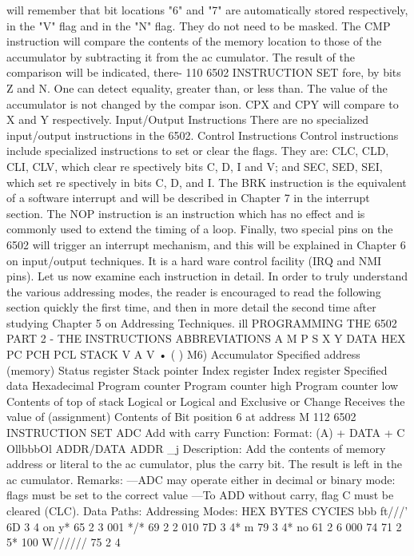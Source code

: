 will remember that bit locations "6" and "7" are automatically
stored respectively, in the "V" flag and in the "N" flag. They do not
need to be masked.
The CMP instruction will compare the contents of the memory
location to those of the accumulator by subtracting it from the ac
cumulator. The result of the comparison will be indicated, there-
110
6502 INSTRUCTION SET
fore, by bits Z and N. One can detect equality, greater than, or less
than. The value of the accumulator is not changed by the compar
ison. CPX and CPY will compare to X and Y respectively.
Input/Output Instructions
There are no specialized input/output instructions in the 6502.
Control Instructions
Control instructions include specialized instructions to set or
clear the flags. They are: CLC, CLD, CLI, CLV, which clear re
spectively bits C, D, I and V; and SEC, SED, SEI, which set re
spectively in bits C, D, and I.
The BRK instruction is the equivalent of a software interrupt
and will be described in Chapter 7 in the interrupt section.
The NOP instruction is an instruction which has no effect and is
commonly used to extend the timing of a loop. Finally, two special
pins on the 6502 will trigger an interrupt mechanism, and this will
be explained in Chapter 6 on input/output techniques. It is a hard
ware control facility (IRQ and NMI pins).
Let us now examine each instruction in detail.
In order to truly understand the various addressing modes, the reader
is encouraged to read the following section quickly the first time, and
then in more detail the second time after studying Chapter 5 on
Addressing Techniques.
ill
PROGRAMMING THE 6502
PART 2 - THE INSTRUCTIONS
ABBREVIATIONS
A
M
P
S
X
Y
DATA
HEX
PC
PCH
PCL
STACK
V
A
V
•
( )
M6)
Accumulator
Specified address (memory)
Status register
Stack pointer
Index register
Index register
Specified data
Hexadecimal
Program counter
Program counter high
Program counter low
Contents of top of stack
Logical or
Logical and
Exclusive or
Change
Receives the value of (assignment)
Contents of
Bit position 6 at address M
112
6502 INSTRUCTION SET
ADC Add with carry
Function:
Format:
(A) + DATA + C
OllbbbOl ADDR/DATA ADDR
_j
Description:
Add the contents of memory address or literal to the ac
cumulator, plus the carry bit. The result is left in the ac
cumulator.
Remarks:
—ADC may operate either in decimal or binary mode: flags
must be set to the correct value
—To ADD without carry, flag C must be cleared (CLC).
Data Paths:
Addressing Modes:
HEX
BYTES
CYCIES
bbb
ft///'
6D
3
4
on
y*
65
2
3
001
*/*
69
2
2
010
7D
3
4*
m
79
3
4*
no
61
2
6
000
74
71
2
5*
100
W//////
75
2
4
